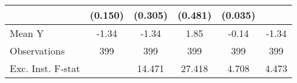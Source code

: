 {\begin{tabular}{l*{5}{c}}
            &     (0.150)         &     (0.305)         &     (0.481)         &     (0.035)         &                     \\
\midrule
Mean Y      &       -1.34         &       -1.34         &        1.85         &       -0.14         &       -1.34         \\
Observations&         399         &         399         &         399         &         399         &         399         \\
Exc. Inst. F-stat&                     &      14.471         &      27.418         &       4.708         &       4.473         \\
\bottomrule
\end{tabular}
}
